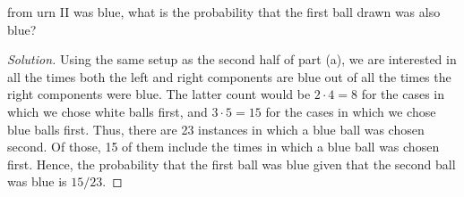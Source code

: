 \documentclass[12pt]{article}
\newenvironment{solution}
{\renewcommand\qedsymbol{$\blacksquare$}\begin{proof}[Solution]}
{\end{proof}}
\begin{document}
\begin{enumerate}
\begin{enumerate}[(a)]
              from urn II was blue, what is the probability that the first ball
              drawn was also blue?  \begin{solution} Using the same setup as
                  the second half of part (a), we are interested in all the
                  times both the left and right components are blue out of all
                  the times the right components were blue. The latter count
                  would be $2\cdot 4=8$ for the cases in which we chose white
                  balls first, and $3\cdot 5=15$ for the cases in which we
                  chose blue balls first. Thus, there are 23 instances in which
                  a blue ball was chosen second. Of those, 15 of them include
                  the times in which a blue ball was chosen first. Hence, the
                  probability that the first ball was blue given that the
                  second ball was blue is $15/23$.  
              \end{solution}
  \end{enumerate} \end{enumerate} 
\end{document}
